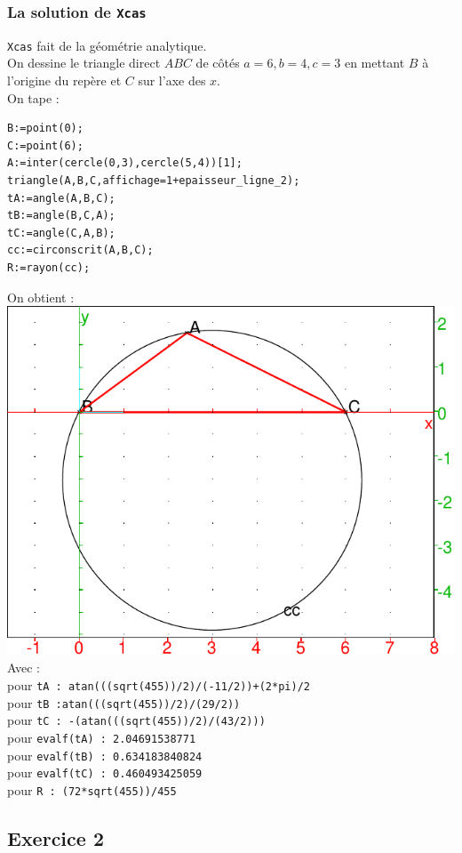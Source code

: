 \documentclass[a4paper,11pt]{book}
\begin{document}
\subsubsection{La solution de {\tt Xcas}}
{\tt Xcas} fait de la g\'eom\'etrie analytique.\\
On dessine le triangle direct $ABC$ de c\^ot\'es $a=6, b=4, c=3$ en mettant 
$B$ \`a l'origine du rep\`ere et $C$ sur l'axe des $x$.\\
On tape :
\begin{verbatim}
B:=point(0);
C:=point(6);
A:=inter(cercle(0,3),cercle(5,4))[1];
triangle(A,B,C,affichage=1+epaisseur_ligne_2);
tA:=angle(A,B,C);
tB:=angle(B,C,A);
tC:=angle(C,A,B);
cc:=circonscrit(A,B,C);
R:=rayon(cc);
\end{verbatim}
On obtient :\\
\includegraphics[width=\textwidth]{baceinst3}\\
Avec :\\
pour {\tt tA : atan(((sqrt(455))/2)/(-11/2))+(2*pi)/2}\\
pour {\tt tB :atan(((sqrt(455))/2)/(29/2))}\\
pour {\tt tC : -(atan(((sqrt(455))/2)/(43/2)))}\\
pour {\tt evalf(tA) : 2.04691538771}\\
pour {\tt evalf(tB) : 0.634183840824}\\
pour {\tt evalf(tC) : 0.460493425059}\\
pour {\tt R : (72*sqrt(455))/455}

\subsection{Exercice 2}
\end{document}
